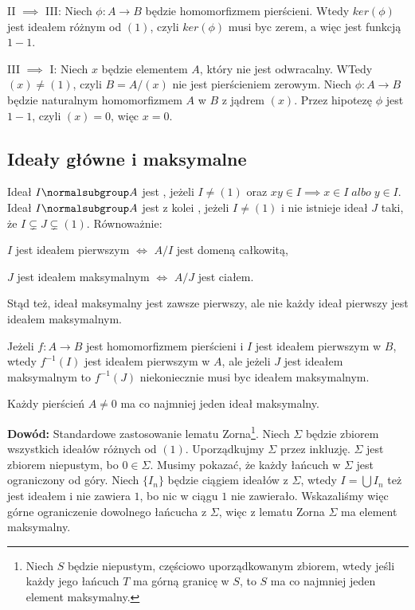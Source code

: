 II $\implies$ III: Niech $\phi:A\to B$ będzie homomorfizmem pierścieni. Wtedy $ker(\phi)$ jest ideałem różnym od $(1)$, czyli $ker(\phi)$ musi byc zerem, a więc jest funkcją $1-1$.

III $\implies$ I: Niech $x$ będzie elementem $A$, który nie jest odwracalny. WTedy $(x)\neq(1)$, czyli $B=A/(x)$ nie jest pierścieniem zerowym. Niech $\phi:A\to B$ będzie naturalnym homomorfizmem $A$ w $B$ z jądrem $(x)$. Przez hipotezę $\phi$ jest $1-1$, czyli $(x)=0$, więc $x=0$.

\proofend

\subsection{Ideały główne i maksymalne}

Ideał $I\normalsubgroup A$ jest , jeżeli $I\neq(1)$ oraz $xy\in I\implies x\in I\;albo\;y\in I$. Ideał $I\normalsubgroup A$ jest z kolei , jeżeli $I\neq (1)$ i nie istnieje ideał $J$ taki, że $I\subsetneq J\subsetneq(1)$. Równoważnie:

\indent \point $I$ jest ideałem pierwszym $\iff$ $A/I$ jest domeną całkowitą,

\indent \point $J$ jest ideałem maksymalnym $\iff$ $A/J$ jest ciałem.

Stąd też, ideał maksymalny jest zawsze pierwszy, ale nie każdy ideał pierwszy jest ideałem maksymalnym.
\medskip

Jeżeli $f:A\to B$ jest homomorfizmem pierścieni i $I$ jest ideałem pierwszym w $B$, wtedy $f^{-1}(I)$ jest ideałem pierwszym w $A$, ale jeżeli $J$ jest ideałem maksymalnym to $f^{-1}(J)$ niekoniecznie musi byc ideałem maksymalnym.
\medskip

 Każdy pierścień $A\neq 0$ ma co najmniej jeden ideał maksymalny. 

\textbf{Dowód:} Standardowe zastosowanie lematu Zorna\footnote{Niech $S$ będzie niepustym, częściowo uporządkowanym zbiorem, wtedy jeśli każdy jego łańcuch $T$ ma górną granicę w $S$, to $S$ ma co najmniej jeden element maksymalny.}. Niech $\Sigma$ będzie zbiorem wszystkich ideałów różnych od $(1)$. Uporządkujmy $\Sigma$ przez inkluzję. $\Sigma$ jest zbiorem niepustym, bo $0\in\Sigma$. Musimy pokazać, że każdy łańcuch w $\Sigma$ jest ograniczony od góry. Niech $\{I_n\}$ będzie ciągiem ideałów z $\Sigma$, wtedy $I=\bigcup I_n$ też jest ideałem i nie zawiera $1$, bo nic w ciągu $1$ nie zawierało. Wskazaliśmy więc górne ograniczenie dowolnego łańcucha z $\Sigma$, więc z lematu Zorna $\Sigma$ ma element maksymalny.

